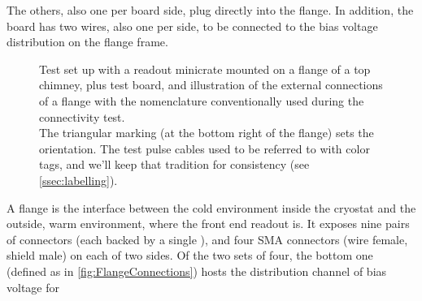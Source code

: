 The others, also one per board side, plug directly into the flange.
In addition, the board has two wires, also one per side, to be connected to the
bias voltage distribution on the flange frame.
\begin{figure}
  \centering
  \caption{
    \protect{}
      Test set up with a readout minicrate mounted on a flange of a top chimney,
      plus test board, and
    \protect{}
      illustration of the external connections of a flange with the nomenclature
      conventionally used during the connectivity test.
    \\
    The triangular marking (at the bottom right of the flange) sets the orientation.
    The test pulse cables used to be referred to with color tags, and we'll keep
    that tradition for consistency (see \cref{ssec:labelling}).
  }
\end{figure}
A flange is the interface between the cold environment inside the cryostat and 
the outside, warm environment, where the front end readout is.
It exposes nine pairs of connectors (each backed by a single \DBB), and four SMA
connectors (wire female, shield male) on each of two sides.
Of the two sets of four, the bottom one (defined as in
\cref{fig:FlangeConnections}) hosts the distribution channel of bias voltage for
